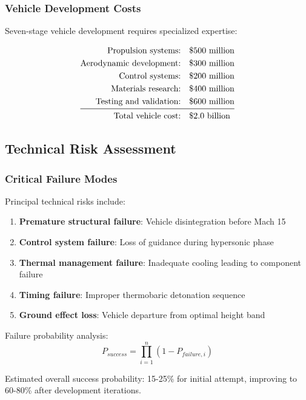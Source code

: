 \documentclass[12pt,a4paper]{article}
\begin{document}
\subsubsection{Vehicle Development Costs}
Seven-stage vehicle development requires specialized expertise:

\begin{align}
\text{Propulsion systems:} &\quad \$500 \text{ million} \\
\text{Aerodynamic development:} &\quad \$300 \text{ million} \\
\text{Control systems:} &\quad \$200 \text{ million} \\
\text{Materials research:} &\quad \$400 \text{ million} \\
\text{Testing and validation:} &\quad \$600 \text{ million} \\
\midrule
\text{Total vehicle cost:} &\quad \$2.0 \text{ billion}
\end{align}

\subsection{Technical Risk Assessment}

\subsubsection{Critical Failure Modes}
Principal technical risks include:

\begin{enumerate}
\item \textbf{Premature structural failure}: Vehicle disintegration before Mach 15
\item \textbf{Control system failure}: Loss of guidance during hypersonic phase  
\item \textbf{Thermal management failure}: Inadequate cooling leading to component failure
\item \textbf{Timing failure}: Improper thermobaric detonation sequence
\item \textbf{Ground effect loss}: Vehicle departure from optimal height band
\end{enumerate}

Failure probability analysis:
\begin{equation}
P_{success} = \prod_{i=1}^{n} (1 - P_{failure,i})
\label{eq:success_probability}
\end{equation}

Estimated overall success probability: 15-25\% for initial attempt, improving to 60-80\% after development iterations.
\end{document}
